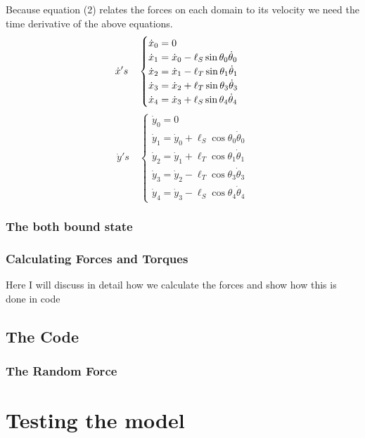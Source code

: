 		\noindent Because equation (2) relates the forces on each domain to its velocity we need the time derivative of the above equations. 
		\begin{equation}
		\dot{x}'s \quad \begin{cases}
		\dot{x}_0 = 0 \\
		\dot{x}_1 = \dot{x}_0-\ell_S\sin\theta_0 \dot{\theta}_0 \\
		\dot{x}_2 = \dot{x}_1-\ell_T\sin\theta_1 \dot{\theta}_1 \\
		\dot{x}_3 = \dot{x}_2+\ell_T\sin\theta_3 \dot{\theta}_3 \\
		\dot{x}_4 = \dot{x}_3+\ell_S\sin\theta_4 \dot{\theta}_4
		\end{cases} \\
		\end{equation}
		\begin{equation}
		\dot{y}'s \quad \begin{cases}
		\dot{y}_0 = 0 \\
		\dot{y}_1 = \dot{y}_0 + \ell_S\cos\theta_0\dot{\theta}_0 \\
		\dot{y}_2 = \dot{y}_1 + \ell_T\cos\theta_1\dot{\theta}_1 \\
		\dot{y}_3 = \dot{y}_2 - \ell_T\cos\theta_3\dot{\theta}_3 \\
		\dot{y}_4 = \dot{y}_3 - \ell_S\cos\theta_4\dot{\theta}_4
		\end{cases} 
		\end{equation}
		
		\subsubsection{The both bound state}
		\subsubsection{Calculating Forces and Torques}
			Here I will discuss in detail how we calculate the forces and show how this is done in code 
	\subsection{The Code}
		\subsubsection{The Random Force}
\section{Testing the model} 
